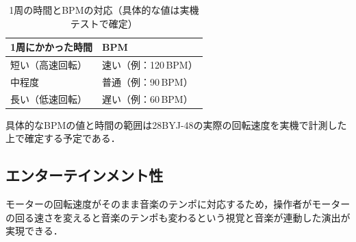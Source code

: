 \documentclass[uplatex,dvipdfmx,report]{jlreq}
\begin{document}
\begin{table}[H]
  \centering
  \caption{1周の時間とBPMの対応（具体的な値は実機テストで確定）}
  \label{tab:bpm_proposal}
  \begin{tabular}{l l}
    \toprule
    1周にかかった時間 & BPM \\
    \midrule
    短い（高速回転） & 速い（例：120\,BPM） \\
    中程度 & 普通（例：90\,BPM） \\
    長い（低速回転） & 遅い（例：60\,BPM） \\
    \bottomrule
  \end{tabular}
\end{table}

具体的なBPMの値と時間の範囲は28BYJ-48の実際の回転速度を実機で計測した上で確定する予定である．

\subsection{エンターテインメント性}

モーターの回転速度がそのまま音楽のテンポに対応するため，操作者がモーターの回る速さを変えると音楽のテンポも変わるという視覚と音楽が連動した演出が実現できる．
\end{document}
